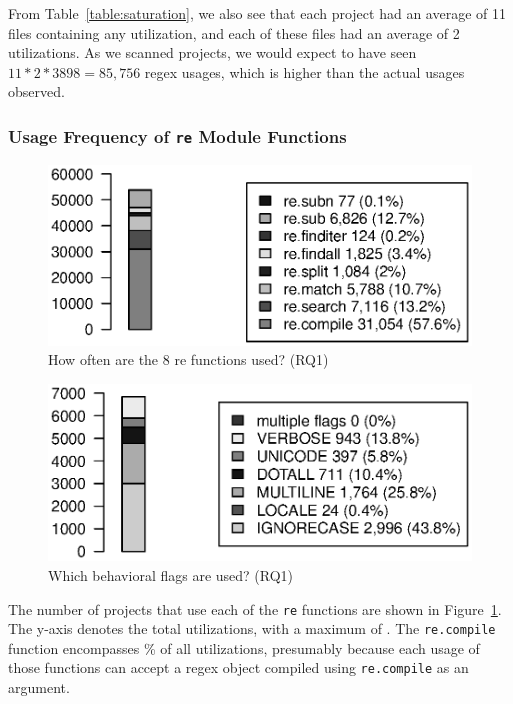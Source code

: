 From Table~\ref{table:saturation}, we also see that each project had an average of 11 files containing any utilization, and each of these files had an average of 2 utilizations.  As we scanned  projects, we would expect to have seen $11*2*3898=85,756$ regex usages, which is higher than the actual  usages observed. 



\subsubsection{Usage Frequency of {\tt re} Module Functions}

\begin{figure}[tb]
\centering
\includegraphics[width=\columnwidth]{../analysis_output/partFunctions.eps}
\caption{How often are the 8 re functions used? (RQ1)}
\label{fig:partFunctions}
\end{figure}

\begin{figure}[tb]
\centering
\includegraphics[width=\columnwidth]{../analysis_output/partFlags.eps}
\caption{Which behavioral flags are used? (RQ1)}
\label{fig:partFlags}
\end{figure}

The number of projects that use each of the {\tt re} functions are shown in Figure~\ref{fig:partFunctions}.  The y-axis denotes the total utilizations, with a maximum of . The {\tt re.compile} function encompasses \% of all utilizations, presumably because each usage of those functions can accept a regex object compiled using {\tt re.compile} as an argument.

